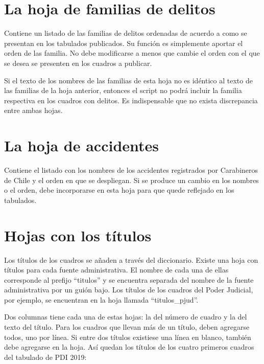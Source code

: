 \documentclass[
  spanish,
]{book}
\begin{document}
\hypertarget{la-hoja-de-familias-de-delitos}{%
\section{La hoja de familias de delitos}\label{la-hoja-de-familias-de-delitos}}

Contiene un listado de las familias de delitos ordenadas de acuerdo a como se presentan en los tabulados publicados. Su función es simplemente aportar el orden de las familia. No debe modificarse a menos que cambie el orden con el que se desea se presenten en los cuadros a publicar.

Si el texto de los nombres de las familias de esta hoja no es idéntico al texto de las familias de la hoja anterior, entonces el script no podrá incluir la familia respectiva en los cuadros con delitos. Es indispensable que no exista discrepancia entre ambas hojas.

\hypertarget{la-hoja-de-accidentes}{%
\section{La hoja de accidentes}\label{la-hoja-de-accidentes}}

Contiene el listado con los nombres de los accidentes registrados por Carabineros de Chile y el orden en que se despliegan. Si se produce un cambio en los nombres o el orden, debe incorporarse en esta hoja para que quede reflejado en los tabulados.

\hypertarget{hojas-con-los-tuxedtulos}{%
\section{Hojas con los títulos}\label{hojas-con-los-tuxedtulos}}

Los títulos de los cuadros se añaden a través del diccionario. Existe una hoja con títulos para cada fuente administrativa. El nombre de cada una de ellas corresponde al prefijo ``titulos'' y se encuentra separada del nombre de la fuente administrativa por un guión bajo. Los títulos de los cuadros del Poder Judicial, por ejemplo, se encuentran en la hoja llamada ``titulos\_pjud''.

Dos columnas tiene cada una de estas hojas: la del número de cuadro y la del texto del título. Para los cuadros que llevan más de un título, deben agregarse todos, uno por línea. Si entre dos títulos existiese una línea en blanco, también debe agregarse en la hoja. Así quedan los títulos de los cuatro primeros cuadros del tabulado de PDI 2019:
\end{document}
